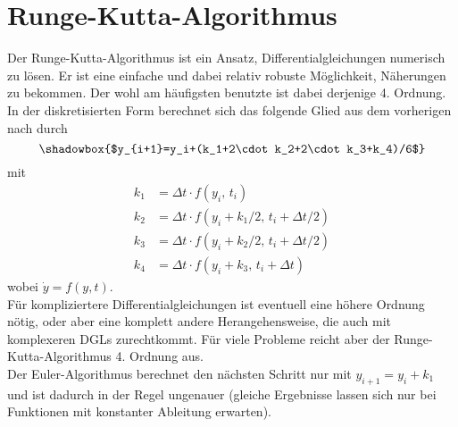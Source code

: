 \documentclass[12pt,a4paper,titlepage,headinclude,bibtotoc]{scrartcl}
\begin{document}
\section{Runge-Kutta-Algorithmus}
Der Runge-Kutta-Algorithmus ist ein Ansatz, Differentialgleichungen numerisch zu lösen.
Er ist eine einfache und dabei relativ robuste Möglichkeit, Näherungen zu bekommen.
Der wohl am häufigsten benutzte ist dabei derjenige 4. Ordnung.
In der diskretisierten Form berechnet sich das folgende Glied aus dem vorherigen nach \cite[S.130]{scientificcomp} durch
$$\shadowbox{$y_{i+1}=y_i+(k_1+2\cdot k_2+2\cdot k_3+k_4)/6$}$$ 
mit
\begin{align*}
k_1&=\Delta t\cdot f(y_i,\, t_i)\\
k_2&=\Delta t\cdot f(y_i+k_1/2,\, t_i+\Delta t/2)\\
k_3&=\Delta t\cdot f(y_i+k_2/2,\, t_i+\Delta t/2)\\
k_4&=\Delta t\cdot f(y_i+k_3,\, t_i+\Delta t)
\end{align*}
wobei $\dot y=f(y,t)$.\\
Für kompliziertere Differentialgleichungen ist eventuell eine höhere Ordnung nötig, oder aber eine komplett andere Herangehensweise, die auch mit komplexeren DGLs zurechtkommt.
Für viele Probleme reicht aber der Runge-Kutta-Algorithmus 4. Ordnung aus.\\
Der Euler-Algorithmus berechnet den nächsten Schritt nur mit $y_{i+1}=y_i+k_1$ und ist dadurch in der Regel ungenauer (gleiche Ergebnisse lassen sich nur bei Funktionen mit konstanter Ableitung erwarten).
\end{document}
